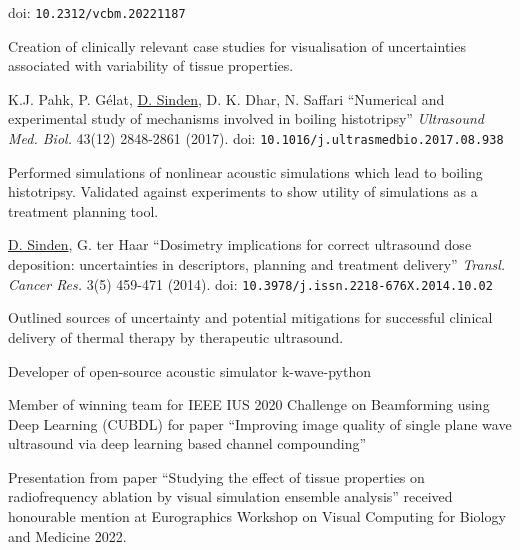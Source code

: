 \documentclass[checked=true, walterbenjamin=false]{dfg-cv-en}
\begin{document}
\begin{compactEnumerate}
doi: \texttt{10.2312/vcbm.20221187}
\begin{compactItemize}
\item Creation of clinically relevant case studies for visualisation of uncertainties associated with variability of tissue properties.\end{compactItemize}
\item  K.J. Pahk, P. Gélat, \uline{D. Sinden}, D. K. Dhar, N. Saffari \enquote{Numerical and experimental study of mechanisms involved in boiling histotripsy} \emph{Ultrasound Med. Biol.} 43(12) 2848-2861 (2017).\newline%
doi: \texttt{10.1016/j.ultrasmedbio.2017.08.938}
\begin{compactItemize}
\item Performed simulations of nonlinear acoustic simulations which lead to boiling histotripsy. Validated against experiments to show utility of simulations as a treatment planning tool.
\end{compactItemize}
\item \uline{D. Sinden}, G. ter Haar \enquote{Dosimetry implications for correct ultrasound dose deposition: uncertainties in descriptors, planning and treatment delivery} \emph{Transl. Cancer Res.} 3(5) 459-471 (2014). \newline%
doi: \texttt{10.3978/j.issn.2218-676X.2014.10.02}
\begin{compactItemize}
\item Outlined sources of uncertainty and potential mitigations for successful clinical delivery of thermal therapy by therapeutic ultrasound. 
\end{compactItemize}
\end{compactEnumerate}

\secCategoryB 
\noindent%
Developer of open-source acoustic simulator k-wave-python

\secAwards
\begin{compactItemize}
\item Member of winning team for IEEE IUS 2020 Challenge on Beamforming using Deep Learning (CUBDL) for paper \enquote{Improving image quality of single plane wave ultrasound via deep learning based channel compounding}
\item Presentation from paper \enquote{Studying the effect of tissue properties on radiofrequency ablation by visual simulation ensemble analysis} received honourable mention at Eurographics Workshop on Visual Computing for Biology and Medicine 2022.
\end{compactItemize}

\secOther 
\end{document}

